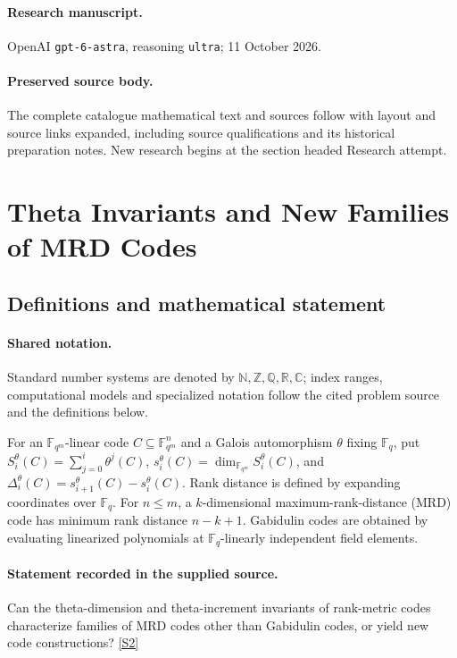 \documentclass[11pt]{article}
\begin{document}
\paragraph{Research manuscript.} OpenAI \texttt{gpt-6-astra}, reasoning \texttt{ultra}; 11 October 2026.
\paragraph{Preserved source body.} The complete catalogue mathematical text and sources follow with layout and source links expanded, including source qualifications and its historical preparation notes. New research begins at the section headed Research attempt.

\section{Theta Invariants and New Families of MRD Codes}\label{statement}

\subsection{Definitions and mathematical statement}

\paragraph{Shared notation.}Standard number systems are denoted by $\mathbb N,\mathbb Z,\mathbb Q,\mathbb R,\mathbb C$; index ranges, computational models and specialized notation follow the cited problem source and the definitions below.


For an $\mathbb F_{q^m}$-linear code $C\subseteq\mathbb F_{q^m}^{n}$ and a Galois automorphism $\theta$ fixing $\mathbb F_q$, put $S_i^\theta(C)=\sum_{j=0}^{i}\theta^j(C)$, $s_i^\theta(C)=\dim_{\mathbb F_{q^m}}S_i^\theta(C)$, and $\Delta_i^\theta(C)=s_{i+1}^\theta(C)-s_i^\theta(C)$. Rank distance is defined by expanding coordinates over $\mathbb F_q$. For $n\leq m$, a $k$-dimensional maximum-rank-distance (MRD) code has minimum rank distance $n-k+1$. Gabidulin codes are obtained by evaluating linearized polynomials at $\mathbb F_q$-linearly independent field elements.
\paragraph{Statement recorded in the supplied source.}
Can the theta-dimension and theta-increment invariants of rank-metric codes characterize families of MRD codes other than Gabidulin codes, or yield new code constructions? \href{https://doi.org/10.4171/owr/2019/13}{[S2]}
\end{document}
